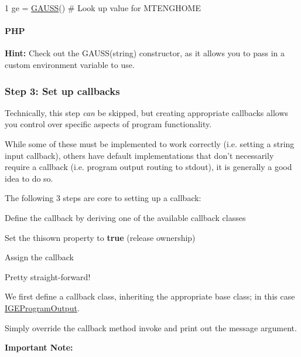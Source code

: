 \begin{DoxyCode}
1 ge = \hyperlink{class_g_a_u_s_s}{GAUSS}()  \textcolor{comment}{# Look up value for MTENGHOME}
\end{DoxyCode}
 \paragraph*{P\-H\-P}




{\bfseries Hint\-:} Check out the {\ttfamily G\-A\-U\-S\-S(string)} constructor, as it allows you to pass in a custom environment variable to use.

\subsubsection*{Step 3\-: Set up callbacks}

Technically, this step {\itshape can} be skipped, but creating appropriate callbacks allows you control over specific aspects of program functionality.

While some of these must be implemented to work correctly (i.\-e. setting a string input callback), others have default implementations that don't necessarily require a callback (i.\-e. program output routing to {\ttfamily stdout}), it is generally a good idea to do so.

The following 3 steps are core to setting up a callback\-:
\begin{DoxyEnumerate}
\item Define the callback by deriving one of the available callback classes
\item Set the {\ttfamily thisown} property to {\bfseries true} (release ownership)
\item Assign the callback
\end{DoxyEnumerate}

Pretty straight-\/forward!

We first define a callback class, inheriting the appropriate base class; in this case \hyperlink{class_i_g_e_program_output}{I\-G\-E\-Program\-Output}.

Simply override the callback method {\ttfamily invoke} and print out the {\ttfamily message} argument.

{\bfseries Important Note\-:}

